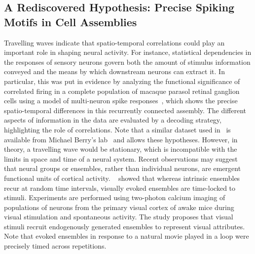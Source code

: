 \documentclass[brainsci, %
               review,accept,pdftex,moreauthors
               ]{Definitions/mdpi}
\begin{document}
\subsection{A Rediscovered Hypothesis: Precise Spiking Motifs in Cell Assemblies}
Travelling waves indicate that spatio-temporal correlations could play an important role in shaping neural activity. For instance, statistical dependencies in the responses of sensory neurons govern both the amount of stimulus information conveyed and the means by which downstream neurons can extract it. In particular, this was put in evidence by analyzing the functional significance of correlated firing in a complete population of macaque parasol retinal ganglion cells using a model of multi-neuron spike responses~\citep{pillow_spatio-temporal_2008}, which shows the precise spatio-temporal differences in this recurrently connected assembly. The different aspects of information in the data are evaluated by a decoding strategy, highlighting the role of correlations. Note that a similar dataset used in~\citep{schneidman_weak_2006} is available from Michael Berry's lab~\citep{berry_spike_2022} and allows  these hypotheses. However,  in theory, a  travelling wave would be stationary, which is incompatible with the limits in space and time of a neural system. Recent observations may suggest that neural groups or ensembles, rather than individual neurons, are emergent functional units of cortical activity. ~\citet{miller_visual_2014} showed that whereas intrinsic ensembles recur at random time intervals, visually evoked ensembles are time-locked to stimuli. Experiments are performed using two-photon calcium imaging of populations of neurons from the primary visual cortex of awake mice during visual stimulation and spontaneous activity. The study proposes that visual stimuli recruit endogenously generated ensembles to represent visual attributes. Note that evoked ensembles in response to a natural movie played in a loop were precisely timed across repetitions. %
\end{document}
